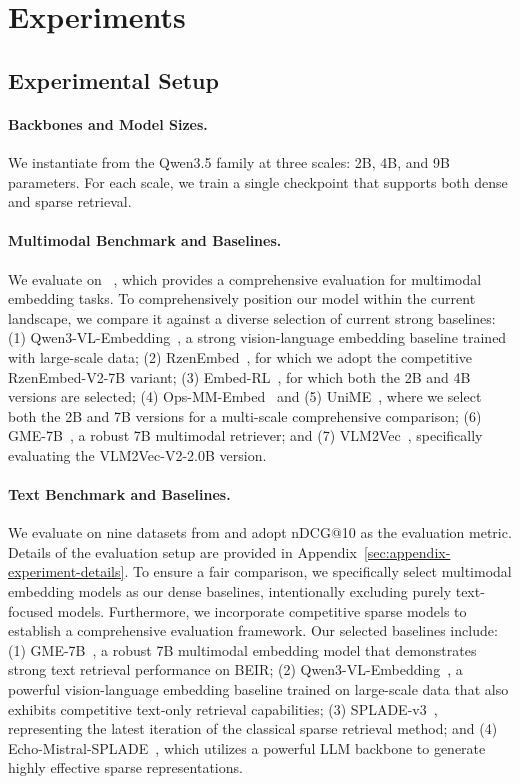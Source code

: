 \section{Experiments}\label{sec:experiments}

\subsection{Experimental Setup}\label{sec:exp-setup}

\paragraph{Backbones and Model Sizes.}
We instantiate \ours from the Qwen3.5 family at three scales: 2B, 4B, and 9B parameters.
For each scale, we train a single checkpoint that supports both dense and sparse retrieval. 

\paragraph{Multimodal Benchmark and Baselines.}
We evaluate \ours on \mmebv~\citep{vlm2vecv2}, which provides a comprehensive evaluation for multimodal embedding tasks. 
To comprehensively position our model within the current landscape, we compare it against a diverse selection of current strong baselines:
(1) Qwen3-VL-Embedding~\citep{qwenvlembedding}, a strong vision-language embedding baseline trained with large-scale data; 
(2) RzenEmbed~\citep{rzenembed}, for which we adopt the competitive RzenEmbed-V2-7B variant; 
(3) Embed-RL~\citep{embedrl}, for which both the 2B and 4B versions are selected; 
(4) Ops-MM-Embed~\citep{ops} and (5) UniME~\citep{unime2025}, where we select both the 2B and 7B versions for a multi-scale comprehensive comparison; 
(6) GME-7B~\citep{gme}, a robust 7B multimodal retriever; and
(7) VLM2Vec~\citep{vlm2vecv2}, specifically evaluating the VLM2Vec-V2-2.0B version.

\paragraph{Text Benchmark and Baselines.}
We evaluate \ours on nine datasets from \beir and adopt nDCG@10 as the evaluation metric. Details of the evaluation setup are provided in Appendix~\ref{sec:appendix-experiment-details}.
To ensure a fair comparison, we specifically select multimodal embedding models as our dense baselines, intentionally excluding purely text-focused models. Furthermore, we incorporate competitive sparse models to establish a comprehensive evaluation framework. Our selected baselines include:
(1) GME-7B~\citep{gme}, a robust 7B multimodal embedding model that demonstrates strong text retrieval performance on BEIR; 
(2) Qwen3-VL-Embedding~\citep{qwenvlembedding}, a powerful vision-language embedding baseline trained on large-scale data that also exhibits competitive text-only retrieval capabilities;
(3) SPLADE-v3~\citep{spladev3}, representing the latest iteration of the classical sparse retrieval method; and
(4) Echo-Mistral-SPLADE~\citep{mistralsplade}, which utilizes a powerful LLM backbone to generate highly effective sparse representations.

